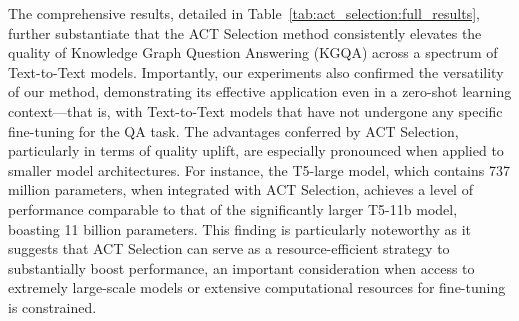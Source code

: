 The comprehensive results, detailed in Table~\ref{tab:act_selection:full_results}, further substantiate that the ACT Selection method consistently elevates the quality of Knowledge Graph Question Answering (KGQA) across a spectrum of Text-to-Text models. Importantly, our experiments also confirmed the versatility of our method, demonstrating its effective application even in a zero-shot learning context—that is, with Text-to-Text models that have not undergone any specific fine-tuning for the QA task. The advantages conferred by ACT Selection, particularly in terms of quality uplift, are especially pronounced when applied to smaller model architectures. For instance, the T5-large model, which contains 737 million parameters, when integrated with ACT Selection, achieves a level of performance comparable to that of the significantly larger T5-11b model, boasting 11 billion parameters. This finding is particularly noteworthy as it suggests that ACT Selection can serve as a resource-efficient strategy to substantially boost performance, an important consideration when access to extremely large-scale models or extensive computational resources for fine-tuning is constrained.


